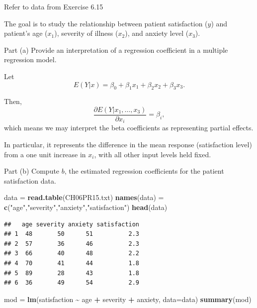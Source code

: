 \documentclass[
]{article}
\newenvironment{Shaded}{\begin{snugshade}}{\end{snugshade}}
\newcommand{\AttributeTok}[1]{\textcolor[rgb]{0.13,0.29,0.53}{#1}}
\newcommand{\FunctionTok}[1]{\textcolor[rgb]{0.13,0.29,0.53}{\textbf{#1}}}
\newcommand{\NormalTok}[1]{#1}
\newcommand{\OtherTok}[1]{\textcolor[rgb]{0.56,0.35,0.01}{#1}}
\newcommand{\SpecialCharTok}[1]{\textcolor[rgb]{0.81,0.36,0.00}{\textbf{#1}}}
\newcommand{\StringTok}[1]{\textcolor[rgb]{0.31,0.60,0.02}{#1}}
\begin{document}
Refer to data from Exercise 6.15

The goal is to study the relationship between patient satisfaction
(\(y\)) and patient's age (\(x_1\)), severity of illness (\(x_2\)), and
anxiety level (\(x_3\)).

\begin{tcolorbox}[split=\f]
Part (a)
\tcblower
Provide an interpretation of a regression coefficient in a multiple regression
model.
\end{tcolorbox}

Let \[
  E(Y|x) = \beta_0 + \beta_1 x_1 + \beta_2 x_2 + \beta_3 x_3.
\]

Then, \[
  \frac{\partial  E(Y|x_1,\ldots,x_3)}{\partial x_i} = \beta_i,
\] which means we may interpret the beta coefficients as representing
partial effects.

In particular, it represents the difference in the mean response
(satisfaction level) from a one unit increase in \(x_i\), with all other
input levels held fixed.

\begin{tcolorbox}[split=\f]
Part (b)
\tcblower
Compute $b$, the estimated regression coefficients for the patient satisfaction
data.
\end{tcolorbox}

\begin{Shaded}
\begin{Highlighting}[]
\NormalTok{data }\OtherTok{=} \FunctionTok{read.table}\NormalTok{(}\StringTok{\textquotesingle{}CH06PR15.txt\textquotesingle{}}\NormalTok{)}
\FunctionTok{names}\NormalTok{(data) }\OtherTok{=} \FunctionTok{c}\NormalTok{(}\StringTok{"age"}\NormalTok{,}\StringTok{"severity"}\NormalTok{,}\StringTok{"anxiety"}\NormalTok{,}\StringTok{"satisfaction"}\NormalTok{)}
\FunctionTok{head}\NormalTok{(data)}
\end{Highlighting}
\end{Shaded}

\begin{verbatim}
##   age severity anxiety satisfaction
## 1  48       50      51          2.3
## 2  57       36      46          2.3
## 3  66       40      48          2.2
## 4  70       41      44          1.8
## 5  89       28      43          1.8
## 6  36       49      54          2.9
\end{verbatim}

\begin{Shaded}
\begin{Highlighting}[]
\NormalTok{mod }\OtherTok{=} \FunctionTok{lm}\NormalTok{(satisfaction }\SpecialCharTok{\textasciitilde{}}\NormalTok{ age }\SpecialCharTok{+}\NormalTok{ severity }\SpecialCharTok{+}\NormalTok{ anxiety, }\AttributeTok{data=}\NormalTok{data)}
\FunctionTok{summary}\NormalTok{(mod)}
\end{Highlighting}
\end{Shaded}
\end{document}
